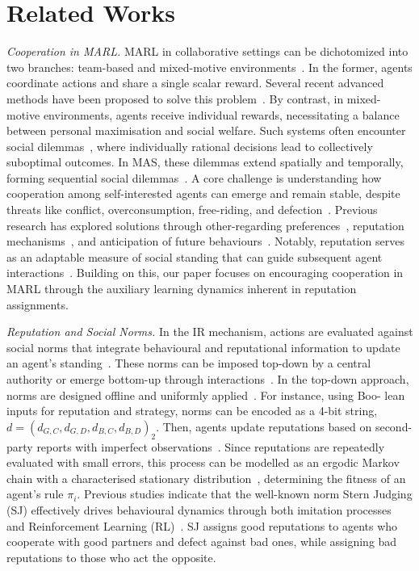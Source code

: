 \section{Related Works}
\textit{Cooperation in MARL.} MARL in collaborative settings can be dichotomized into two branches: team-based and mixed-motive environments~\cite{du2023review}. In the former, agents coordinate actions and share a single scalar reward. Several recent advanced methods have been proposed to solve this problem~\cite{yu2022surprising,sunehag2018value,son2019qtran}. By contrast, in mixed-motive environments, agents receive individual rewards, necessitating a balance between personal maximisation and social welfare. Such systems often encounter social dilemmas~\cite{van2013psychology}, where individually rational decisions lead to collectively suboptimal outcomes. In MAS, these dilemmas extend spatially and temporally, forming sequential social dilemmas~\cite{leibo2017multi}. A core challenge is understanding how cooperation among self-interested agents can emerge and remain stable, despite threats like conflict, overconsumption, free-riding, and defection~\cite{du2023review}. Previous research has explored solutions through other-regarding preferences~\cite{mckee2021multi,hughes2018inequity}, reputation mechanisms~\cite{anastassacos2021cooperation,smit2024learning}, and anticipation of future behaviours~\cite{foerster2018learning,yang2020learning}. Notably, reputation serves as an adaptable measure of social standing that can guide subsequent agent interactions~\cite{anastassacos2020partner}. Building on this, our paper focuses on encouraging cooperation in MARL through the auxiliary learning dynamics inherent in reputation assignments.

\textit{Reputation and Social Norms.} In the IR mechanism, actions are evaluated against social norms that integrate behavioural and reputational information to update an agent's standing~\cite{nowak2005evolution}. These norms can be imposed top-down by a central authority or emerge bottom-up through interactions~\cite{savarimuthu2011norm}. In the top-down approach, norms are designed offline and uniformly applied~\cite{santos2016social}. For instance, using Boo- lean inputs for reputation and strategy, norms can be encoded as a 4-bit string, $d=(d_{G, C},d_{G, D},d_{B, C},d_{B, D})_2$. Then, agents update reputations based on second-party reports with imperfect observations~\cite{haynes2017engineering}. Since reputations are repeatedly evaluated with small errors, this process can be modelled as an ergodic Markov chain with a characterised stationary distribution~\cite{ohtsuki2004should}, determining the fitness of an agent’s rule $\pi_i$. Previous studies indicate that the well-known norm Stern Judging (SJ) effectively drives behavioural dynamics through both imitation processes~\cite{santos2016social} and Reinforcement Learning (RL)~\cite{smit2024learning}. SJ assigns good reputations to agents who cooperate with good partners and defect against bad ones, while assigning bad reputations to those who act the opposite.

